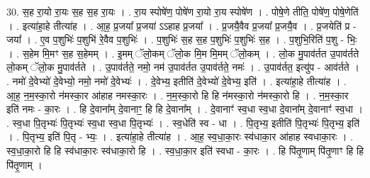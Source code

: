 \documentclass[17pt]{extarticle}
\begin{document}
30. स॒ह रा॒यो रा॒यः स॒ह स॒ह रा॒यः । . रा॒य स्पोषे॑ण॒ पोषे॑ण रा॒यो रा॒य स्पोषे॑ण । . पोषे॒णे तीति॒ पोषे॑ण॒ पोषे॒णेति॑ । . इत्या॑हा॒हे तीत्या॑ह । . आ॒ह॒ प्र॒जया᳚ प्र॒जया॑ ऽऽहाह प्र॒जया᳚ । . प्र॒जयै॒वैव प्र॒जया᳚ प्र॒जयै॒व । . प्र॒जयेति॑ प्र - जया᳚ । . ए॒व प॒शुभिः॑ प॒शुभि॑ रे॒वैव प॒शुभिः॑ । . प॒शुभिः॑ स॒ह स॒ह प॒शुभिः॑ प॒शुभिः॑ स॒ह । . प॒शुभि॒रिति॑ प॒शु - भिः॒ । . स॒हेम मि॒मꣳ स॒ह स॒हेमम् । . इ॒मम् ॅलो॒कम् ॅलो॒क मि॒म मि॒मम् ॅलो॒कम् । . लो॒क मु॒पाव॑र्तत उ॒पाव॑र्तते लो॒कम् ॅलो॒क मु॒पाव॑र्तते । . उ॒पाव॑र्तते॒ नमो॒ नम॑ उ॒पाव॑र्तत उ॒पाव॑र्तते॒ नमः॑ । . उ॒पाव॑र्तत॒ इत्यु॑प - आव॑र्तते । . नमो॑ दे॒वेभ्यो॑ दे॒वेभ्यो॒ नमो॒ नमो॑ दे॒वेभ्यः॑ । . दे॒वेभ्य॒ इतीति॑ दे॒वेभ्यो॑ दे॒वेभ्य॒ इति॑ । . इत्या॑हा॒हे तीत्या॑ह । . आ॒ह॒ न॒म॒स्का॒रो न॑मस्का॒र आ॑हाह नमस्का॒रः । . न॒म॒स्का॒रो हि हि न॑मस्का॒रो न॑मस्का॒रो हि । . न॒म॒स्का॒र इति॑ नमः - का॒रः । . हि दे॒वाना᳚म् दे॒वानाꣳ॒॒ हि हि दे॒वाना᳚म् । . दे॒वानाꣳ॑ स्व॒धा स्व॒धा दे॒वाना᳚म् दे॒वानाꣳ॑ स्व॒धा । . स्व॒धा पि॒तृभ्यः॑ पि॒तृभ्यः॑ स्व॒धा स्व॒धा पि॒तृभ्यः॑ । . स्व॒धेति॑ स्व - धा । . पि॒तृभ्य॒ इतीति॑ पि॒तृभ्यः॑ पि॒तृभ्य॒ इति॑ । . पि॒तृभ्य॒ इति॑ पि॒तृ - भ्यः॒ । . इत्या॑हा॒हे तीत्या॑ह । . आ॒ह॒ स्व॒धा॒का॒रः स्व॑धाका॒र आ॑हाह स्वधाका॒रः । . स्व॒धा॒का॒रो हि हि स्व॑धाका॒रः स्व॑धाका॒रो हि । . स्व॒धा॒का॒र इति॑ स्वधा - का॒रः । . हि पि॑तृ॒णाम् पि॑तृ॒णाꣳ हि हि पि॑तृ॒णाम् । \newline
\end{document}
